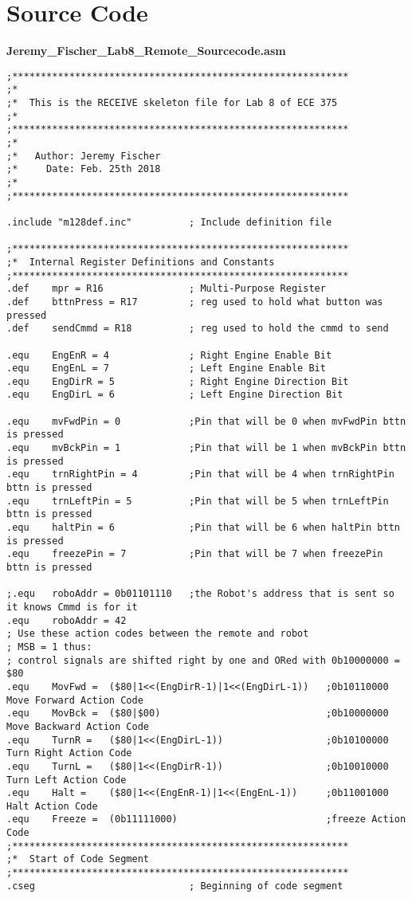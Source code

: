 \documentclass[12pt,letterpaper]{article}
\begin{document}
\section{Source Code}
\clearpage
	\textbf{Jeremy\_Fischer\_Lab8\_Remote\_Sourcecode.asm}
	\begin{verbatim}
;***********************************************************
;*
;*	This is the RECEIVE skeleton file for Lab 8 of ECE 375
;*
;***********************************************************
;*
;*	 Author: Jeremy Fischer
;*	   Date: Feb. 25th 2018
;*
;***********************************************************

.include "m128def.inc"			; Include definition file

;***********************************************************
;*	Internal Register Definitions and Constants
;***********************************************************
.def	mpr = R16				; Multi-Purpose Register
.def	bttnPress = R17			; reg used to hold what button was pressed
.def 	sendCmmd = R18			; reg used to hold the cmmd to send

.equ	EngEnR = 4				; Right Engine Enable Bit
.equ	EngEnL = 7				; Left Engine Enable Bit
.equ	EngDirR = 5				; Right Engine Direction Bit
.equ	EngDirL = 6				; Left Engine Direction Bit

.equ	mvFwdPin = 0			;Pin that will be 0 when mvFwdPin bttn is pressed
.equ	mvBckPin = 1			;Pin that will be 1 when mvBckPin bttn is pressed
.equ	trnRightPin = 4			;Pin that will be 4 when trnRightPin bttn is pressed
.equ	trnLeftPin = 5			;Pin that will be 5 when trnLeftPin bttn is pressed
.equ	haltPin = 6				;Pin that will be 6 when haltPin bttn is pressed
.equ	freezePin = 7			;Pin that will be 7 when freezePin bttn is pressed

;.equ 	roboAddr = 0b01101110	;the Robot's address that is sent so it knows Cmmd is for it
.equ 	roboAddr = 42
; Use these action codes between the remote and robot
; MSB = 1 thus:
; control signals are shifted right by one and ORed with 0b10000000 = $80
.equ	MovFwd =  ($80|1<<(EngDirR-1)|1<<(EngDirL-1))	;0b10110000 Move Forward Action Code
.equ	MovBck =  ($80|$00)								;0b10000000 Move Backward Action Code
.equ	TurnR =   ($80|1<<(EngDirL-1))					;0b10100000 Turn Right Action Code
.equ	TurnL =   ($80|1<<(EngDirR-1))					;0b10010000 Turn Left Action Code
.equ	Halt =    ($80|1<<(EngEnR-1)|1<<(EngEnL-1))		;0b11001000 Halt Action Code
.equ	Freeze =  (0b11111000)							;freeze Action Code
;***********************************************************
;*	Start of Code Segment
;***********************************************************
.cseg							; Beginning of code segment


\end{verbatim}
\end{document}

